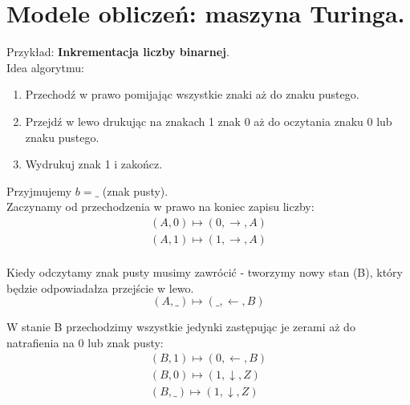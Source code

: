 \documentclass[main.tex]{subfiles}
\begin{document}
    \newpage

    \section{Modele obliczeń: maszyna Turinga.}

    Przykład: \textbf{Inkrementacja liczby binarnej}.\\

    \noindent Idea algorytmu:
    \begin{enumerate}
        \item Przechodź w prawo pomijając wszystkie znaki aż do znaku pustego.
        \item Przejdź w lewo drukując na znakach 1 znak 0 aż do oczytania znaku 0 lub znaku pustego.
        \item Wydrukuj znak 1 i zakończ.
    \end{enumerate}
    Przyjmujemy $b = \_$ (znak pusty).\\


    Zaczynamy od przechodzenia w prawo na koniec zapisu liczby:
    \begin{gather*}
        (A, 0) \mapsto (0, \rightarrow, A)\\
        (A, 1) \mapsto (1, \rightarrow, A)\\
    \end{gather*}

    Kiedy odczytamy znak pusty musimy zawrócić - tworzymy nowy stan (B), który będzie odpowiadałza przejście w lewo.
    \[ (A, \_) \mapsto (\_, \leftarrow, B) \]

    W stanie B przechodzimy wszystkie jedynki zastępując je zerami aż do natrafienia na 0 lub znak pusty:
    \begin{gather*}
        (B, 1) \mapsto (0, \leftarrow, B)\\
        (B, 0) \mapsto (1, \downarrow, Z)\\
        (B, \_) \mapsto (1, \downarrow, Z)\\
    \end{gather*}
\end{document}
